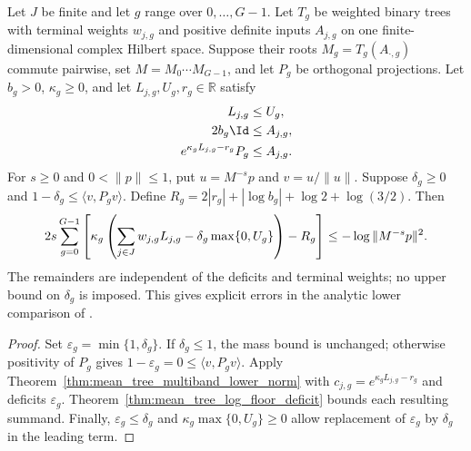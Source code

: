 \begin{theorem}
\label{thm:mean_tree_exponential_lower_norm}
\leanok
{}
Let $J$ be finite and let $g$ range over $0,\ldots,G-1$. Let $T_g$ be
weighted binary trees with terminal weights $w_{j,g}$ and positive
definite inputs $A_{j,g}$ on one finite-dimensional complex Hilbert
space. Suppose their roots $M_g=T_g(A_{\cdot,g})$ commute pairwise,
set $M=M_0\cdots M_{G-1}$, and let $P_g$ be orthogonal projections.
Let $b_g>0$, $\kappa_g\ge0$, and
let $L_{j,g},U_g,r_g\in\mathbb R$ satisfy
\begin{align}
 L_{j,g}&\le U_g,\notag\\
 2b_g\Id&\le A_{j,g},\notag\\
 e^{\kappa_gL_{j,g}-r_g}P_g&\le A_{j,g}.
 \notag
\end{align}
For $s\ge0$ and $0<\|p\|\le1$, put $u=M^{-s}p$ and $v=u/\|u\|$.
Suppose $\delta_g\ge0$ and
$1-\delta_g\le\langle v,P_gv\rangle$. Define
$R_g=2|r_g|+|\log b_g|+\log2+\log(3/2)$. Then
\begin{align}
 2s\sum_{g=0}^{G-1}\left[
   \kappa_g\left(\sum_{j\in J}w_{j,g}L_{j,g}
                  -\delta_g\max\{0,U_g\}\right)-R_g\right]
 \le-\log\|M^{-s}p\|^2.
 \notag
\end{align}
The remainders are independent of the deficits and terminal weights;
no upper bound on $\delta_g$ is imposed. This gives explicit errors in
the analytic lower comparison of \cite[Section~8]{OpenAI2026AreaLaw}.
\end{theorem}

\begin{proof}
\leanok
{}
Set $\varepsilon_g=\min\{1,\delta_g\}$. If $\delta_g\le1$, the mass
bound is unchanged; otherwise positivity of $P_g$ gives
$1-\varepsilon_g=0\le\langle v,P_gv\rangle$.
Apply Theorem~\ref{thm:mean_tree_multiband_lower_norm} with
$c_{j,g}=e^{\kappa_gL_{j,g}-r_g}$ and deficits $\varepsilon_g$.
Theorem~\ref{thm:mean_tree_log_floor_deficit} bounds each resulting
summand. Finally, $\varepsilon_g\le\delta_g$ and
$\kappa_g\max\{0,U_g\}\ge0$ allow replacement of $\varepsilon_g$ by
$\delta_g$ in the leading term.
\end{proof}
